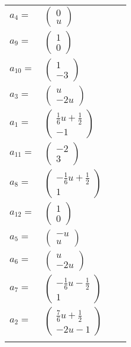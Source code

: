 \documentclass[1p]{elsarticle_modified}
\theoremstyle{definition}
\begin{document}
\begin{tabular}{m{7pt} m{180pt} m{7pt} m{180pt} }
\flushright $a_{4}=$&$\begin{pmatrix}0\\u\end{pmatrix}$ \\
\flushright $a_{9}=$&$\begin{pmatrix}1\\0\end{pmatrix}$ \\
\flushright $a_{10}=$&$\begin{pmatrix}1\\-3\end{pmatrix}$ \\
\flushright $a_{3}=$&$\begin{pmatrix}u\\-2 u\end{pmatrix}$ \\
\flushright $a_{1}=$&$\begin{pmatrix}\frac{1}{6} u+\frac{1}{2}\\-1\end{pmatrix}$ \\
\flushright $a_{11}=$&$\begin{pmatrix}-2\\3\end{pmatrix}$ \\
\flushright $a_{8}=$&$\begin{pmatrix}-\frac{1}{6} u+\frac{1}{2}\\1\end{pmatrix}$ \\
\flushright $a_{12}=$&$\begin{pmatrix}1\\0\end{pmatrix}$ \\
\flushright $a_{5}=$&$\begin{pmatrix}- u\\u\end{pmatrix}$ \\
\flushright $a_{6}=$&$\begin{pmatrix}u\\-2 u\end{pmatrix}$ \\
\flushright $a_{7}=$&$\begin{pmatrix}-\frac{1}{6} u-\frac{1}{2}\\1\end{pmatrix}$ \\
\flushright $a_{2}=$&$\begin{pmatrix}\frac{7}{6} u+\frac{1}{2}\\-2 u-1\end{pmatrix}$\\&\end{tabular}
\end{document}

